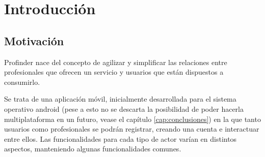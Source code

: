 \chapter{Introducción}
\label{cap:introduccion}


\section{Motivación}
Profinder nace del concepto de agilizar y simplificar las relaciones entre profesionales que ofrecen un servicio y usuarios que están dispuestos a consumirlo.

Se trata de una aplicación móvil, inicialmente desarrollada 
para el sistema operativo android (pese a esto no se descarta la posibilidad de poder hacerla multiplataforma en un futuro, vease el capítulo \ref{cap:conclusiones}) en la que tanto usuarios como profesionales se podrán registrar, creando una cuenta e interactuar entre ellos. Las funcionalidades para cada tipo de actor varían en distintos aspectos, manteniendo algunas funcionalidades comunes.  


